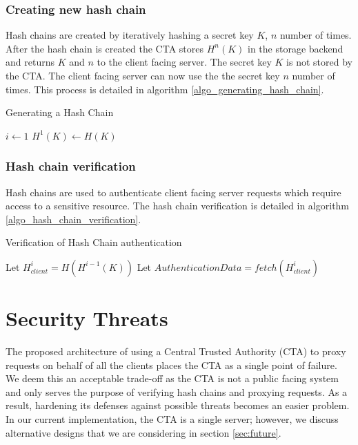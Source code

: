 \documentclass{sig-alternate-05-2015}
\begin{document}
\subsubsection{Creating new hash chain}
Hash chains are created by iteratively hashing a secret key $K$, $n$ number of times. 
After the hash chain is created the CTA stores $H^{n}(K)$ in the storage backend and returns $K$ and $n$ to the client facing server. The secret key $K$ is not stored by the CTA. The client facing server can now use the the secret key $n$ number of times. This process is detailed in algorithm  \ref{algo_generating_hash_chain}.

\begin{algorithm}
\SetAlgoLined
\caption{Generating a Hash Chain}
\label{algo_generating_hash_chain}
\LinesNumbered
{}
$i \leftarrow 1 $\;
$H^{1}(K) \leftarrow H(K)$ \;
 \;
\end{algorithm}
\subsubsection{Hash chain verification}
Hash chains are used to authenticate client facing server requests which require access to a sensitive resource. The hash chain verification is detailed in algorithm \ref{algo_hash_chain_verification}.

\begin{algorithm}
\label{algo_hash_chain_verification}
\SetAlgoLined
\caption{Verification of Hash Chain authentication}
\LinesNumbered
{}
	Let $H_{client}^{i} = H(H^{i-1}(K))$ \;
	Let $AuthenticationData = fetch(H_{client}^{i})$ \;
	
\end{algorithm}


\section{Security Threats}

The proposed architecture of using a Central Trusted Authority (CTA) to proxy requests on behalf of all the clients places the CTA as a single point of failure.  We deem this an acceptable trade-off as the CTA is not a public facing system and only serves the purpose of verifying hash chains and proxying requests.  As a result, hardening its defenses against possible threats becomes an easier problem.  In our current implementation, the CTA is a single server; however, we discuss alternative designs that we are considering in section \ref{sec:future}.
\end{document}

